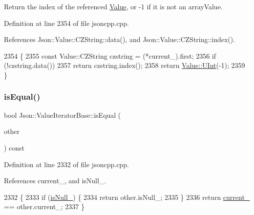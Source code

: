 Return the index of the referenced \hyperlink{class_json_1_1_value}{Value}, or -\/1 if it is not an array\+Value. 



Definition at line 2354 of file jsoncpp.\+cpp.



References Json\+::\+Value\+::\+C\+Z\+String\+::data(), and Json\+::\+Value\+::\+C\+Z\+String\+::index().


\begin{DoxyCode}
2354                                     \{
2355   \textcolor{keyword}{const} Value::CZString czstring = (*current\_).first;
2356   \textcolor{keywordflow}{if} (!czstring.data())
2357     \textcolor{keywordflow}{return} czstring.index();
2358   \textcolor{keywordflow}{return} \hyperlink{class_json_1_1_value_a0933d59b45793ae4aade1757c322a98d}{Value::UInt}(-1);
2359 \}
\end{DoxyCode}
\mbox{\label{class_json_1_1_value_iterator_base_a010b5ad3f3337ae3732e5d7e16ca5e25}} 
\subsubsection{\texorpdfstring{is\+Equal()}{isEqual()}}
{\footnotesize\ttfamily bool Json\+::\+Value\+Iterator\+Base\+::is\+Equal (\begin{DoxyParamCaption}\item[{const \hyperlink{class_json_1_1_value_iterator_base_a9d2a940d03ea06d20d972f41a89149ee}{Self\+Type} \&}]{other }\end{DoxyParamCaption}) const\hspace{0.3cm}{\ttfamily [protected]}}



Definition at line 2332 of file jsoncpp.\+cpp.



References current\+\_\+, and is\+Null\+\_\+.


\begin{DoxyCode}
2332                                                            \{
2333   \textcolor{keywordflow}{if} (\hyperlink{class_json_1_1_value_iterator_base_a3e08b114a1aed9bde518c527f94a8c59}{isNull\_}) \{
2334     \textcolor{keywordflow}{return} other.isNull\_;
2335   \}
2336   \textcolor{keywordflow}{return} \hyperlink{class_json_1_1_value_iterator_base_ab3138ce8af8301cca3b041ea55cb922a}{current\_} == other.current\_;
2337 \}
\end{DoxyCode}
\mbox{\label{class_json_1_1_value_iterator_base_a3838ba39c43c518cf3ed4aa6ce78ccad}} 
